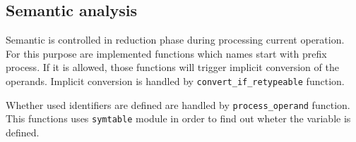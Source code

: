 \subsection{Semantic analysis}
Semantic is controlled in reduction phase during processing current operation. For this purpose are implemented functions which names start with prefix process. If it is allowed, those functions will trigger implicit conversion of the operands. Implicit conversion is handled by \verb|convert_if_retypeable| function.

Whether used identifiers are defined are handled by \verb|process_operand| function. This functions uses \verb|symtable| module in order to find out wheter the variable is defined.



